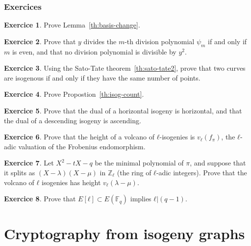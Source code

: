 \documentclass[10pt]{article}
\theoremstyle{plain}
\theoremstyle{definition}
\newtheorem{exercice}{Exercice}[part]
\def\F{\ensuremath{\mathbb{F}}}
\begin{document}
\section*{Exercices}

\begin{exercice}
  Prove Lemma~\ref{th:basis-change}.
\end{exercice}

\begin{exercice}
  Prove that $y$ divides the $m$-th division polynomial $ψ_m$ if and
  only if $m$ is even, and that no division polynomial is divisible by
  $y^2$.
\end{exercice}

\begin{exercice}
  Using the Sato-Tate theorem~\ref{th:sato-tate2}, prove that two
  curves are isogenous if and only if they have the same number of
  points.
\end{exercice}

\begin{exercice}
  Prove Propostion~\ref{th:isog-count}.
\end{exercice}

\begin{exercice}
  Prove that the dual of a horizontal isogeny is horizontal, and that
  the dual of a descending isogeny is ascending.
\end{exercice}

\begin{exercice}
  Prove that the height of a volcano of $ℓ$-isogenies is $v_ℓ(f_π)$,
  the $ℓ$-adic valuation of the Frobenius endomorphism.
\end{exercice}

\begin{exercice}
  Let $X^2-tX-q$ be the minimal polynomial of $π$, and suppose that it
  splits as $(X-λ)(X-μ)$ in $ℤ_ℓ$ (the ring of $ℓ$-adic integers). %
  Prove that the volcano of $ℓ$ isogenies has height $v_ℓ(λ-μ)$.
\end{exercice}

\begin{exercice}
  \label{ex:group-struct}
  Prove that $E[ℓ]⊂E(\F_q)$ implies $ℓ|(q-1)$.
\end{exercice}


\clearpage
\part{Cryptography from isogeny graphs }
\end{document}
